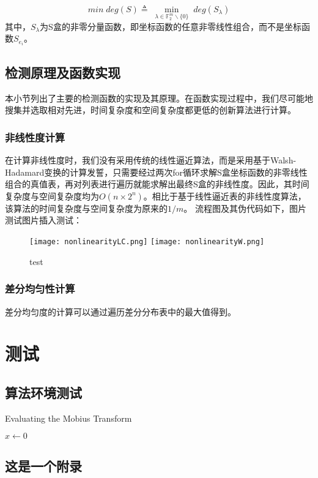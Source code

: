 \documentclass{xduugthesis}
\begin{document}
\begin{equation}
    min\; deg(S) \triangleq \; \mathop{min}\limits_{\lambda \in \mathbb{F}_2^m \backslash \{0\}}\; deg(S_{\lambda})
\end{equation}
其中，$S_{\lambda}$为S盒的非零分量函数，即坐标函数的任意非零线性组合，而不是坐标函数$S_{e_i}$。



\section{检测原理及函数实现}
本小节列出了主要的检测函数的实现及其原理。在函数实现过程中，我们尽可能地搜集并选取相对先进，时间复杂度和空间复杂度都更低的创新算法进行计算。
\subsection{非线性度计算}
在计算非线性度时，我们没有采用传统的线性逼近算法，而是采用基于Walsh-Hadamard变换的计算发誓，只需要经过两次for循环求解S盒坐标函数的非零线性组合的真值表，再对列表进行遍历就能求解出最终S盒的非线性度。因此，其时间复杂度与空间复杂度均为$O(n×2^n)$。相比于基于线性逼近表的非线性度算法，该算法的时间复杂度与空间复杂度为原来的$1/m$。
流程图及其伪代码如下，图片测试图片插入测试：\par
\begin{figure}
    \centering
    \texttt{[image: nonlinearityLC.png]}
    \hspace{1in}
    \texttt{[image: nonlinearityW.png]}
    \caption{test}
  \end{figure}

\subsection{差分均匀性计算}
差分均匀度的计算可以通过遍历差分分布表中的最大值得到。

\chapter{测试}
\section{算法环境测试}
\begin{algorithm}
    \caption{Evaluating the Mobius Transform}
    \begin{algorithmic}
        \STATE $x\gets0$
        \ELSE
        \ENDIF
    \end{algorithmic}
\end{algorithm}


\printbibliography
\backmatter
\begin{appendixes}
    \chapter{这是一个附录}
\end{appendixes}
\end{document}
